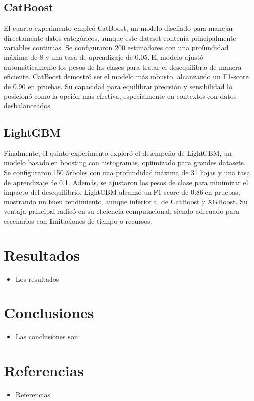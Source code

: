\documentclass[9pt,a4paper,twoside]{rho-class/rho}
\begin{document}
        \subsection{CatBoost}
            El cuarto experimento empleó CatBoost, un modelo diseñado para manejar directamente datos categóricos, aunque este dataset contenía principalmente variables continuas. Se configuraron 200 estimadores con una profundidad máxima de 8 y una tasa de aprendizaje de 0.05. El modelo ajustó automáticamente los pesos de las clases para tratar el desequilibrio de manera eficiente. CatBoost demostró ser el modelo más robusto, alcanzando un F1-score de 0.90 en pruebas. Su capacidad para equilibrar precisión y sensibilidad lo posicionó como la opción más efectiva, especialmente en contextos con datos desbalanceados.

        \subsection{LightGBM}
            Finalmente, el quinto experimento exploró el desempeño de LightGBM, un modelo basado en boosting con histogramas, optimizado para grandes datasets. Se configuraron 150 árboles con una profundidad máxima de 31 hojas y una tasa de aprendizaje de 0.1. Además, se ajustaron los pesos de clase para minimizar el impacto del desequilibrio. LightGBM alcanzó un F1-score de 0.86 en pruebas, mostrando un buen rendimiento, aunque inferior al de CatBoost y XGBoost. Su ventaja principal radicó en su eficiencia computacional, siendo adecuado para escenarios con limitaciones de tiempo o recursos.

    \section{Resultados}
        \begin{itemize}
            \item Los resultados
        \end{itemize}
    \section{Conclusiones}
        \begin{itemize}
            \item Las conclusiones son:
        \end{itemize}
    \section{Referencias}
        \begin{itemize}
            \item Referencias 
        \end{itemize}
    \renewcommand{\contentsname}{Tabla de Contenidos}
    \tableofcontents
    \linenumbers

\printbibliography

\end{document}
